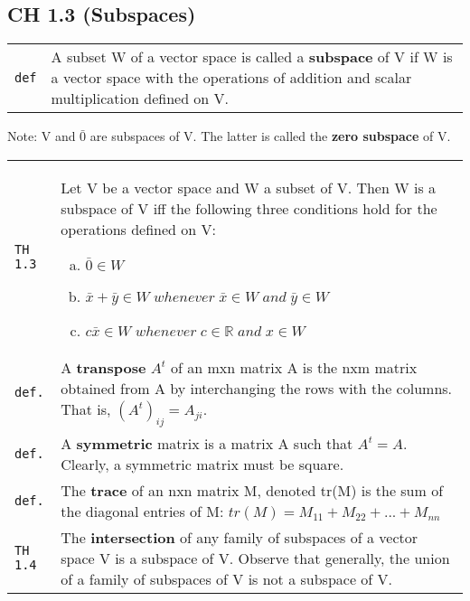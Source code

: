 \documentclass[10pt,landscape]{article}
\begin{document}
\begin{multicols}{3}
\section{CH 1.3 (Subspaces)}
\begin{tabular}{@{}p{\the\MyLen}%
                @{}p{\linewidth-\the\MyLen}@{}} %
\verb!def! & A subset W of a vector space is called a \textbf{subspace} of V if W is a vector space with the operations of addition and scalar multiplication defined on V.\\
\end{tabular}
Note: V and {$\bar 0$} are subspaces of V. The latter is called the \textbf{zero subspace} of V.\\
\begin{tabular}{@{}p{\the\MyLen}%
                @{}p{\linewidth-\the\MyLen}@{}} %
\verb!TH 1.3! & Let V be a vector space and W a subset of V. Then W is a subspace of V iff the following three conditions hold for the operations defined on V:
			\begin{enumerate}[a)]
			 \item $\bar 0\!\in\! W$
			 \item $\bar x + \bar y \in\! W\; whenever\; \bar x \in W \; and \; \bar y \in W$
			 \item $c\bar x \in\!W\; whenever\; c\in\mathbb{R} \; and\; x\in W$
			\end{enumerate}\\
\verb!def.! & A \textbf{transpose} $A^t$ of an mxn matrix A is the nxm matrix obtained from A by interchanging the rows with the columns. That is, $(A^t)_{ij} = A_{ji}$.\\
\verb!def.! & A \textbf{symmetric} matrix is a matrix A such that $A^t = A$. Clearly, a symmetric matrix must be square.\\
\verb!def.! & The \textbf{trace} of an nxn matrix M, denoted tr(M) is the sum of the diagonal entries of M:
		   $tr(M) = M_{11} + M_{22} + ... + M_{nn}$\\
\verb!TH 1.4! & The \textbf{intersection} of any family of subspaces of a vector space V is a subspace of V. Observe that generally, the union of a family of subspaces of V is not a subspace of V.
\end{tabular}




\end{multicols}
\end{document}
